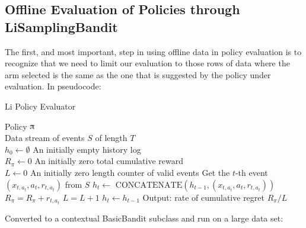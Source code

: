 \documentclass[nojss]{jss}\usepackage[]{graphicx}\usepackage[]{color}
\begin{document}
\subsection{Offline Evaluation of Policies through LiSamplingBandit}

The first, and most important, step in using offline data in policy evaluation is to recognize that we need to limit our evaluation to those rows of data where the arm selected is the same as the one that is suggested by the policy under evaluation. In pseudocode:

\begin{algorithm}[H]
\caption{Li Policy Evaluator}
\label{Alg:LiBandit}
\begin{algorithmic}
\REQUIRE  Policy $\piup$ \\
                 Data stream of events $S$ of length $T$  \\
                 $h_0 \leftarrow \emptyset$ {An initially empty history log}\\
                 $R_\pi \leftarrow 0$ {An initially zero total cumulative reward}\\
                 $L \leftarrow 0$ {An initially zero length counter of valid events}
	\STATE Get the $t$-th event \( (x_{t,a_t},a_{t},r_{t,a_t}) \) from  $S$
	       \STATE $h_{t} \leftarrow $  \(\textrm{CONCATENATE}\left( h_{t-1},(x_{t,a_t},a_{t},r_{t,a_t})  \right)\)
	       \STATE $R_\pi = R_\pi + r_{t,a_t}$
	       \STATE $L = L + 1$
	\ELSE
	        \STATE $h_{t} \leftarrow  h_{t-1} $
	\ENDIF
\ENDFOR
\STATE Output: rate of cumulative regret $R_\pi / L $
\end{algorithmic}
\end{algorithm}

Converted to a contextual BasicBandit subclass and run on a large data set:
\end{document}
